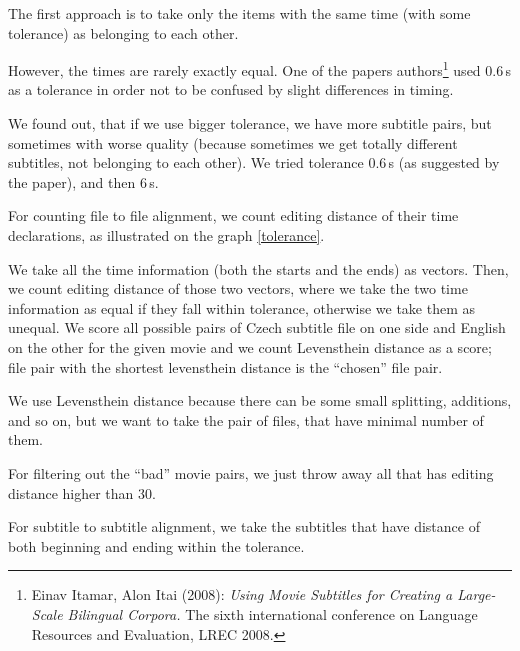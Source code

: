The first approach is to take only the items with the same time (with some tolerance) as belonging to each other.

However, the times are rarely exactly equal. One of the papers authors\footnote{Einav Itamar, Alon Itai (2008): \emph{Using Movie Subtitles for Creating a Large-Scale Bilingual Corpora.} The sixth international conference on Language Resources and Evaluation, LREC 2008.} used 0.6\,s as a tolerance in order not to be confused by slight differences in timing.

We found out, that if we use bigger tolerance, we have more subtitle pairs, but sometimes with worse quality (because sometimes we get totally different subtitles, not belonging to each other). We tried tolerance 0.6\,s (as suggested by the paper), and then 6\,s.

For counting file to file alignment, we count editing distance of their time declarations, as illustrated on the graph \ref{tolerance}. 

We take all the time information (both the starts and the ends) as vectors. Then, we count editing distance of those two vectors, where we take the two time information as equal if they fall within tolerance, otherwise we take them as unequal. We score all possible pairs of Czech subtitle file on one side and English on the other for the given movie and we count Levensthein distance as a score; file pair with the shortest levensthein distance is the ``chosen'' file pair.

We use Levensthein distance because there can be some small splitting, additions, and so on, but we want to take the pair of files, that have minimal number of them.

For filtering out the ``bad'' movie pairs, we just throw away all that has editing distance higher than 30.

For subtitle to subtitle alignment, we take the subtitles that have distance of both beginning and ending within the tolerance.


